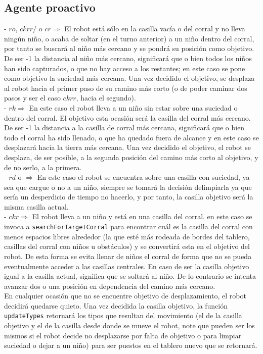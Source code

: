 \documentclass[a4paper,12pt]{article}
\def\code#1{\texttt{#1}}
\begin{document}
\subsection*{Agente proactivo}
- $ro$, $ckrr/$ o $cr \Longrightarrow$ El robot está sólo en la casilla vacía o del corral  y no lleva ningún niño, o acaba de soltar (en el turno anterior) a un niño dentro del corral, por tanto se buscará al niño más cercano y se pondrá su posición como objetivo. De ser -1 la distancia al niño más cercano, significará que o bien todos los niños han sido capturados, o que no hay acceso a los restantes; en este caso se pone como objetivo la suciedad más cercana. Una vez decidido el objetivo, se desplaza al robot hacia el primer paso de su camino más corto (o de poder caminar dos pasos y ser el caso $ckrr$, hacia el segundo).\\
- $rk \Longrightarrow$ En este caso el robot lleva a un niño sin estar sobre una suciedad o dentro del corral. El objetivo esta ocasión será la casilla del corral más cercano. De ser -1 la distancia a la casilla de corral más cercana, significará que o bien todo el corral ha sido llenado, o que ha quedado fuera de alcance y en este caso se desplazará hacia la tierra más cercana. Una vez decidido el objetivo, el robot se desplaza, de ser posible, a la segunda posición del camino más corto al objetivo, y de no serlo, a la primera.\\
- $rd$ o $ \Longrightarrow$ En este caso el robot se encuentra sobre una casilla con suciedad, ya sea que cargue o no a un niño, siempre se tomará la decisión delimpiarla ya que sería un desperdicio de tiempo no hacerlo, y por tanto, la casilla objetivo será la misma casilla actual.\\
- $ckr \Longrightarrow$ El robot lleva a un niño y está en una casilla del corral. en este caso se invoca a \code{searchForTargetCorral} para encontrar cuál es la casilla del corral con menos espacios libres alrededor (la que esté más rodeada de bordes del tablero, casillas del corral con niños u obstáculos) y se convertirá esta en el objetivo del robot. De esta forma se evita llenar de niños el corral de forma que no se pueda eventualmente acceder a las casillas centrales. En caso de ser la casilla objetivo igual a la casilla actual, significa que se soltará al niño. De lo contrario se intenta avanzar dos o una posición en dependencia del camino más cercano.\\

En cualquier ocasión que no se encuentre objetivo de desplazamiento, el robot decidirá quedarse quieto. Una vez decidida la casilla objetivo, la función \code{updateTypes} retornará los tipos que resultan del movimiento (el de la casilla objetivo y el de la casilla desde donde se mueve el robot, note que pueden ser los mismos si el robot decide no desplazarse por falta de objetivo o para limpiar suciedad o dejar a un niño) para ser puestos en el tablero nuevo que se retornará.
\end{document}
